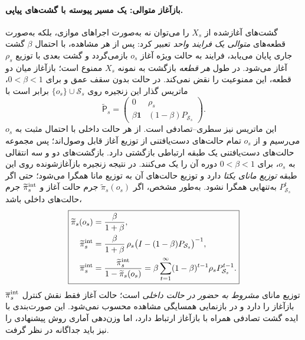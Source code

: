 \paragraph{بازآغاز متوالی: یک مسیر پیوسته با گشت‌های پیاپی.}
گشت‌های آغازشده از $X_s$ را می‌توان
نه به‌صورت اجراهای موازی،
بلکه به‌صورت قطعه‌های
\emph{متوالی یک فرایند واحد}
تعبیر کرد: پس از هر مشاهده،
با احتمال $\beta$ گشت جاری
پایان می‌یابد، فرایند به
حالت ویژه آغاز $o_s$
بازمی‌گردد و گشت بعدی
با توزیع $\rho_s$ آغاز می‌شود.
در طول \emph{هر قطعه} بازگشت
به نمونه $X_s$ ممنوع است؛
بازآغاز میان دو قطعه،
این ممنوعیت را نقض نمی‌کند.
در حالت بدون سقف عمق و
برای $0<\beta<1$،
ماتریس گذار این زنجیره
روی $\{o_s\}\cup\mathcal S_s$
برابر است با
\begin{equation}\label{cmp:eq:ch3-sequential-restart-matrix}
\boxed{
\widetilde{\mathsf P}_s=
\begin{pmatrix}
0&\rho_s\\
\beta\mathbf1&(1-\beta)P_{\mathcal S_s}
\end{pmatrix}.
}
\end{equation}
این ماتریس نیز سطری--تصادفی
است. از هر حالت داخلی با
احتمال مثبت به $o_s$
می‌رسیم و از $o_s$
تمام حالت‌های دست‌یافتنی
از توزیع آغاز قابل وصول‌اند؛
پس مجموعه حالت‌های
دست‌یافتنی یک طبقه
ارتباطی بازگشتی دارد.
بازگشت‌های دو و سه
انتقالی به $o_s$،
برای $0<\beta<1$
دوره آن را یک می‌کنند.
در نتیجه زنجیره
بازآغازشونده روی
این طبقه \emph{توزیع
مانای یکتا} دارد
و توزیع حالت‌های آن
به توزیع مانا همگرا
می‌شود؛ حتی اگر
$P_{\mathcal S_s}^t$
به‌تنهایی همگرا نشود.
به‌طور مشخص، اگر
$\widetilde\pi_s(o_s)$
جرم حالت آغاز و
$\widetilde\pi_s^{\rm int}$
جرم حالت‌های داخلی باشد،
\begin{equation}\label{cmp:eq:ch3-sequential-restart-stationary}
\boxed{
\begin{aligned}
\widetilde\pi_s(o_s)
&=\frac{\beta}{1+\beta},\\
\widetilde\pi_s^{\rm int}
&=\frac{\beta}{1+\beta}\,
\rho_s\bigl(I-(1-\beta)P_{\mathcal S_s}\bigr)^{-1},\\
\overline\pi_s^{\rm int}
&=\frac{\widetilde\pi_s^{\rm int}}
{1-\widetilde\pi_s(o_s)}
=\beta\sum_{t=1}^{\infty}
(1-\beta)^{t-1}\rho_sP_{\mathcal S_s}^{t-1}.
\end{aligned}
}
\end{equation}
$ \overline\pi_s^{\rm int} $
توزیع مانای \emph{مشروط
به حضور در حالت داخلی}
است؛ حالت آغاز فقط
نقش کنترل بازآغاز
را دارد و در
بازنمایی همسایگی
مشاهده محسوب نمی‌شود.
این صورت‌بندی
با ایده گشت تصادفی
همراه با بازآغاز
ارتباط دارد، اما
وزن‌دهی آماری روش
پیشنهادی را نیز باید
جداگانه در نظر گرفت.

